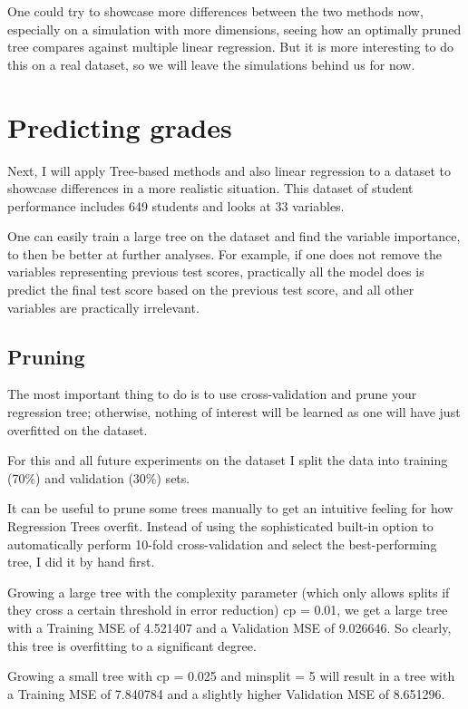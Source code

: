 \documentclass[12pt]{article}
\begin{document}
One could try to showcase more differences between the two methods now, especially on a simulation with more dimensions, seeing how an optimally pruned tree compares against multiple linear regression. But it is more interesting to do this on a real dataset, so we will leave the simulations behind us for now.


\section{Predicting grades}

Next, I will apply Tree-based methods and also linear regression to a dataset to showcase differences in a more realistic situation. This dataset of student performance includes 649 students and looks at 33 variables.

One can easily train a large tree on the dataset and find the variable importance, to then be better at further analyses. For example, if one does not remove the variables representing previous test scores, practically all the model does is predict the final test score based on the previous test score, and all other variables are practically irrelevant.


\subsection{Pruning}

The most important thing to do is to use cross-validation and prune your regression tree; otherwise, nothing of interest will be learned as one will have just overfitted on the dataset.

For this and all future experiments on the dataset I split the data into training (70\%) and validation (30\%) sets.

It can be useful to prune some trees manually to get an intuitive feeling for how Regression Trees overfit. Instead of using the sophisticated built-in option to automatically perform 10-fold cross-validation and select the best-performing tree, I did it by hand first.


Growing a large tree with the complexity parameter (which only allows splits if they cross a certain threshold in error reduction) cp = 0.01, we get a large tree with a Training MSE of 4.521407 and a Validation MSE of 9.026646. So clearly, this tree is overfitting to a significant degree.

Growing a small tree with cp = 0.025 and minsplit = 5 will result in a tree with a Training MSE of 7.840784 and a slightly higher Validation MSE of 8.651296.
\end{document}
